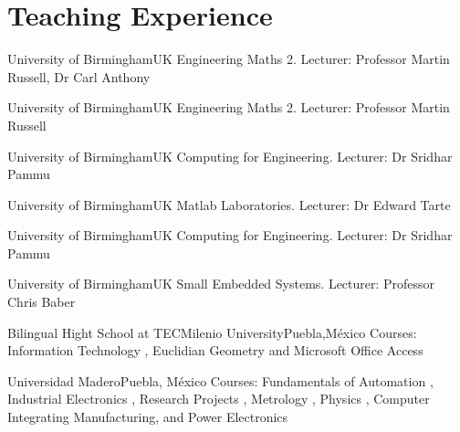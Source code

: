 \documentclass[10pt,a4paper,roman]{moderncv}
\begin{document}
\nocite{*}





\section{Teaching Experience}

{University of Birmingham}{UK}{}
{Engineering Maths 2. Lecturer: Professor Martin Russell, Dr Carl Anthony}

{University of Birmingham}{UK}{}
{Engineering Maths 2. Lecturer: Professor Martin Russell}

{University of Birmingham}{UK}{}
{Computing for Engineering. Lecturer: Dr Sridhar Pammu}

{University of Birmingham}{UK}{}
{Matlab Laboratories. Lecturer: Dr Edward Tarte }

{University of Birmingham}{UK}{}
{Computing for Engineering. Lecturer: Dr Sridhar Pammu}

{University of Birmingham}{UK}{}
{Small Embedded Systems. Lecturer: Professor Chris Baber}

{Bilingual Hight School at TECMilenio University}{Puebla,M\'exico}{}
{Courses:
Information Technology \href{https://sites.google.com/site/perezxochicale/teaching/iit}{\faExternalLink},
Euclidian Geometry  \href{https://sites.google.com/site/perezxochicale/teaching/euclidean-geometry}{\faExternalLink}
and
Microsoft Office Access \href{https://sites.google.com/site/perezxochicale/teaching/moa}{\faExternalLink}
}

{Universidad Madero}{Puebla, M\'exico}{}
{Courses: Fundamentals of Automation
\href{https://sites.google.com/site/perezxochicale/digital-electronics}{\faExternalLink},
Industrial Electronics \href{https://sites.google.com/site/perezxochicale/ie}{\faExternalLink},
Research Projects \href{https://sites.google.com/site/perezxochicale/latex/thesistemplate}{\faExternalLink},
Metrology \href{https://sites.google.com/site/perezxochicale/metrology}{\faExternalLink},
Physics \href{http://goo.gl/fffnG}{\faExternalLink},
Computer Integrating Manufacturing, and Power Electronics
}
\end{document}

